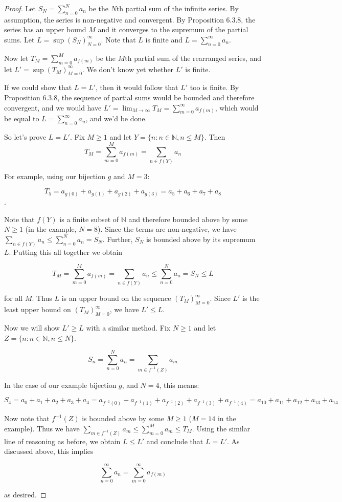 \documentclass{article}
\newcommand{\ra}{\rightarrow}
\begin{document}
\begin{proof}
Let $S_N = \sum_{n=0}^N a_n$ be the $N$th partial sum of the infinite series. By assumption, the series is non-negative and convergent. By Proposition 6.3.8, the series has an upper bound $M$ and it converges to the supremum of the partial sums. Let $L = \sup(S_N)_{N=0}^\infty$. Note that $L$ is finite and $L = \sum_{n=0}^\infty a_n$.

Now let $T_M = \sum_{m=0}^M a_{f(m)}$ be the $M$th partial sum of the rearranged series, and let $L' = \sup(T_M)_{M=0}^\infty$. We don't know yet whether $L'$ is finite.

If we could show that $L = L'$, then it would follow that $L'$ too is finite. By Proposition 6.3.8, the sequence of partial sums would be bounded and therefore convergent, and we would have $L' = \lim_{M \ra \infty} T_M = \sum_{m=0}^\infty a_{f(m)}$, which would be equal to $L = \sum_{n=0}^\infty a_n$, and we'd be done.

So let's prove $L = L'$. Fix $M \geq 1$ and let $Y = \{ n : n \in \mathbb{N}, n \leq M \}$.  Then 
\[ T_M = \sum_{m=0}^M a_{f(m)} = \sum_{n \in f(Y)} a_n \]

For example, using our bijection $g$ and $M = 3$:

\[ T_5 = a_{g(0)} + a_{g(1)} +  a_{g(2)} + a_{g(3)} = a_5 +  a_6 + a_7 + a_8 \].

Note that $f(Y)$ is a finite subset of $\mathbb{N}$ and therefore bounded above by some $N \geq 1$ (in the example, $N = 8$). Since the terms are non-negative, we have $\sum_{n \in f(Y)} a_n \leq \sum_{n =0}^N a_n = S_N$. Further, $S_N$ is bounded above by its supremum $L$. Putting this all together we obtain

\[ T_M = \sum_{m=0}^M a_{f(m)} = \sum_{n \in f(Y)} a_n \leq \sum_{n =0}^N a_n = S_N \leq L \]

for all $M$. Thus $L$ is an upper bound on the sequence $(T_M)_{M=0}^\infty$. Since $L'$ is the least upper bound on $(T_M)_{M=0}^\infty$, we have $L' \leq L$.

Now we will show $L' \geq L$ with a similar method. Fix $N \geq 1$ and let $Z = \{ n : n \in \mathbb{N}, n \leq N \}$.

\[ S_n = \sum_{n=0}^N a_n = \sum_{m \in f^{-1}(Z)} a_m \]

In the case of our example bijection $g$, and $N = 4$, this means:

\[ S_4 = a_0 + a_1 + a_2 + a_3 + a_4 = a_{f^{-1}(0)} + a_{f^{-1}(1)} + a_{f^{-1}(2)} + a_{f^{-1}(3)} + a_{f^{-1}(4)} = a_{10} + a_{11} + a_{12} + a_{13} + a_{14} \]

Now note that $f^{-1}(Z)$ is bounded above by some $M \geq 1$ ($M = 14$ in the example). Thus we have $\sum_{m \in f^{-1}(Z)} a_m \leq \sum_{m=0}^M a_m \leq T_M$. Using the similar line of reasoning as before, we obtain $L \leq L'$ and conclude that $L = L'$. As discussed above, this implies

\[ \sum_{n=0}^\infty a_n   = \sum_{m=0}^\infty a_{f(m)} \]

as desired. 
\end{proof}
\end{document}
